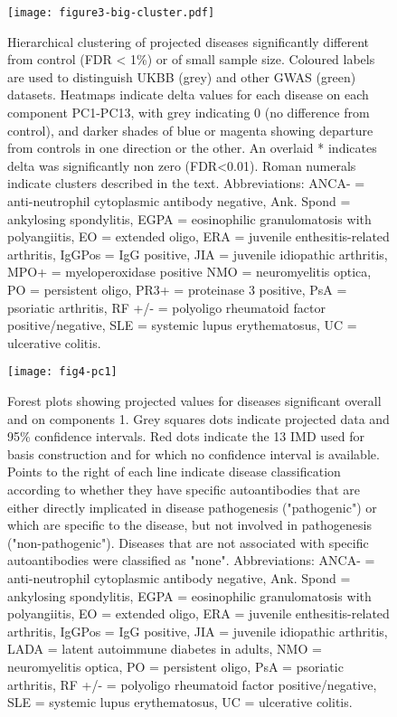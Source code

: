 \documentclass[11pt]{article}
\begin{document}
\begin{figure}
  \centering
  \texttt{[image: figure3-big-cluster.pdf]}
  \caption{Hierarchical clustering of projected diseases significantly different from control (FDR < 1\%) or of small sample size. Coloured labels are used to distinguish UKBB (grey) and other GWAS (green) datasets. Heatmaps indicate delta values for each disease on each component PC1-PC13, with grey indicating 0 (no difference from control), and darker shades of blue or magenta showing departure from controls in one direction or the other. An overlaid * indicates delta was significantly non zero (FDR<0.01). Roman numerals indicate clusters described in the text. Abbreviations: ANCA- = anti-neutrophil cytoplasmic antibody negative, Ank. Spond = ankylosing spondylitis, EGPA = eosinophilic granulomatosis with polyangiitis, EO = extended oligo, ERA = juvenile enthesitis-related arthritis, IgGPos = IgG positive, JIA = juvenile idiopathic arthritis, MPO+ = myeloperoxidase positive NMO = neuromyelitis optica, PO = persistent oligo, PR3+ = proteinase 3 positive, PsA = psoriatic arthritis, RF +/- = polyoligo rheumatoid factor positive/negative, SLE = systemic lupus erythematosus, UC = ulcerative colitis.}
  \label{fig:3}
\end{figure}

\begin{figure}
  \centering
  \texttt{[image: fig4-pc1]}
  \caption{Forest plots showing projected values for diseases significant overall and on components 1. Grey squares dots indicate projected data and 95\% confidence intervals. Red dots indicate the 13 IMD used for basis construction and for which no confidence interval is available. Points to the right of each line indicate disease classification according to whether  they have specific autoantibodies that are either directly implicated in disease pathogenesis ("pathogenic") or which are specific to the disease, but not involved in pathogenesis ("non-pathogenic"). Diseases that are not associated with specific autoantibodies were classified as "none". Abbreviations: ANCA- = anti-neutrophil cytoplasmic antibody negative, Ank. Spond = ankylosing spondylitis, EGPA = eosinophilic granulomatosis with polyangiitis, EO = extended oligo, ERA = juvenile enthesitis-related arthritis, IgGPos = IgG positive, JIA = juvenile idiopathic arthritis, LADA = latent autoimmune diabetes in adults, NMO = neuromyelitis optica, PO = persistent oligo, PsA = psoriatic arthritis, RF +/- = polyoligo rheumatoid factor positive/negative, SLE = systemic lupus erythematosus, UC = ulcerative colitis.}
  \label{fig:4}
\end{figure}
\end{document}
